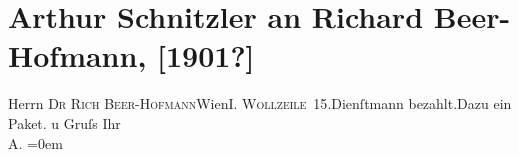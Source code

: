 

         
         \renewcommand{\erwaehntePersonen}{Personen: Richard Beer-Hofmann}
         \renewcommand{\erwaehnteOrte}{Orte: Wien, Wollzeile}
         \renewcommand{\erwaehnteWerke}{}
               \section[Arthur Schnitzler an Richard Beer-Hofmann, {[}1901?{]}]{ Arthur Schnitzler an Richard Beer-Hofmann, {[}1901?{]}}\nopagebreak{}\rehead{ }\begin{ledgroupsized}[t]{13cm}\normalsize\beginnumbering \toendnotes[C]{\smallbreak\pagebreak[2]} 
\toendnotes[C]{\smallbreak}\pstart{}{\pb}Herrn \textsc{Dr Rich
                            Beer-Hofmann}\pend{}\pstart{}Wien\pend{}\pstart{}\textsc{I. Wollzeile 15}.\pend{}\pstart{}Dienſtmann bezahlt.\pend{}\pstart{}Dazu ein Paket.\pend{}{\bigskip}\pstart
           \noindent{}{\pb}\label{K_L01090_1v}\label{K_L01090_1h} u Gruſs\pend
           \pstart
           Ihr{\\[\baselineskip]}\spacefill\mbox{A.}\pend
           \leftskip=0em{}
         
         \endnumbering{}\end{ledgroupsized}  \newcommand{\dateiname}{L01090}\newcommand{\titel}{Arthur Schnitzler an Richard Beer-Hofmann, [1901?]}\newcommand{\editorInnen}{Martin Anton Müller und Gerd-Hermann Susen}
      